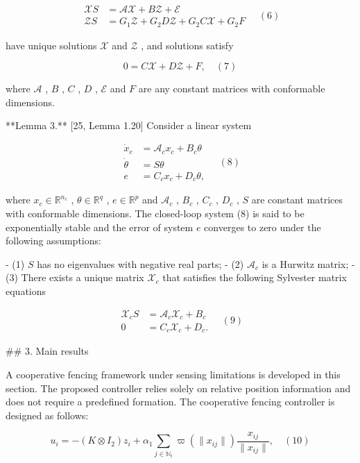 $$\begin{aligned} \mathcal{X} S &= \mathcal{A} \mathcal{X} + B \mathcal{Z} + \mathcal{E} \\ \mathcal{Z} S &= G_1 \mathcal{Z} + G_2 D \mathcal{Z} + G_2 C \mathcal{X} + G_2 F \end{aligned} \quad (6)$$

have unique solutions  $\mathcal{X}$  and  $\mathcal{Z}$ , and solutions satisfy

$$0 = C \mathcal{X} + D \mathcal{Z} + F, \quad (7)$$

where  $\mathcal{A}$ ,  $B$ ,  $C$ ,  $D$ ,  $\mathcal{E}$  and  $F$  are any constant matrices with conformable dimensions.

**Lemma 3.** [25, Lemma 1.20] Consider a linear system

$$\begin{aligned} \dot{x}_c &= \mathcal{A}_c x_c + B_c \theta \\ \dot{\theta} &= S \theta \\ e &= C_c x_c + D_c \theta, \end{aligned} \quad (8)$$

where  $x_c \in \mathbb{R}^{n_c}$ ,  $\theta \in \mathbb{R}^q$ ,  $e \in \mathbb{R}^p$  and  $\mathcal{A}_c$ ,  $B_c$ ,  $C_c$ ,  $D_c$ ,  $S$  are constant matrices with conformable dimensions. The closed-loop system (8) is said to be exponentially stable and the error of system  $e$  converges to zero under the following assumptions:

- (1)  $S$  has no eigenvalues with negative real parts;
- (2)  $\mathcal{A}_c$  is a Hurwitz matrix;
- (3) There exists a unique matrix  $\mathcal{X}_c$  that satisfies the following Sylvester matrix equations

$$\begin{aligned} \mathcal{X}_c S &= \mathcal{A}_c \mathcal{X}_c + B_c \\ 0 &= C_c \mathcal{X}_c + D_c. \end{aligned} \quad (9)$$

## 3. Main results

A cooperative fencing framework under sensing limitations is developed in this section. The proposed controller relies solely on relative position information and does not require a predefined formation. The cooperative fencing controller is designed as follows:

$$u_i = -(K \otimes I_2)z_i + \alpha_1 \sum_{j \in \mathbb{N}_i} \varpi(\|x_{ij}\|) \frac{x_{ij}}{\|x_{ij}\|}, \quad (10)$$

